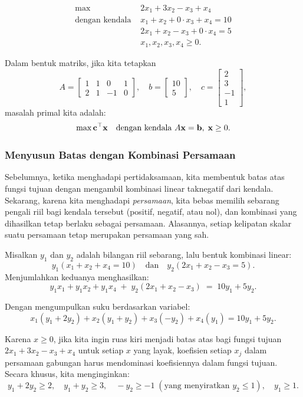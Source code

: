 \[
\begin{aligned}
\max \; & 2x_1 + 3x_2 - x_3 + x_4 \\
\text{dengan kendala } & x_1 + x_2 + 0 \cdot x_3 + x_4 = 10 \\
& 2x_1 + x_2 - x_3 + 0 \cdot x_4 = 5 \\
& x_1, x_2, x_3, x_4 \geq 0.
\end{aligned}
\]

Dalam bentuk matriks, jika kita tetapkan
\[
A = \begin{bmatrix}
1 & 1 & 0 & 1 \\
2 & 1 & -1 & 0
\end{bmatrix}, \quad b = \begin{bmatrix}10 \\ 5\end{bmatrix}, \quad c = \begin{bmatrix}2 \\ 3 \\ -1 \\ 1\end{bmatrix},
\]
masalah primal kita adalah:
\[
\max \mathbf{c}^\top \mathbf{x} \quad\mbox{dengan kendala } A \mathbf{x} = \mathbf{b}, \; \mathbf{x} \geq 0.
\]

\subsubsection*{Menyusun Batas dengan Kombinasi Persamaan}

Sebelumnya, ketika menghadapi pertidaksamaan, kita membentuk batas atas fungsi tujuan dengan mengambil kombinasi linear taknegatif dari kendala. Sekarang, karena kita menghadapi \emph{persamaan}, kita bebas memilih sebarang pengali riil bagi kendala tersebut (positif, negatif, atau nol), dan kombinasi yang dihasilkan tetap berlaku sebagai persamaan. Alasannya, setiap kelipatan skalar suatu persamaan tetap merupakan persamaan yang sah.

Misalkan $y_1$ dan $y_2$ adalah bilangan riil sebarang, lalu bentuk kombinasi linear:
\[
y_1 (x_1 + x_2 + x_4 = 10) \quad \text{dan} \quad y_2 (2x_1 + x_2 - x_3 = 5).
\]
Menjumlahkan keduanya menghasilkan:
\[
y_1 x_1 + y_1 x_2 + y_1 x_4 \;+\; y_2(2x_1 + x_2 - x_3) \;=\; 10y_1 + 5y_2.
\]

Dengan mengumpulkan suku berdasarkan variabel:
\[
x_1(y_1 + 2y_2) + x_2(y_1 + y_2) + x_3(-y_2) + x_4(y_1) = 10y_1 + 5y_2.
\]

Karena $x \geq 0$, jika kita ingin ruas kiri menjadi batas atas bagi fungsi tujuan $2x_1 + 3x_2 - x_3 + x_4$ untuk setiap $x$ yang layak, koefisien setiap $x_j$ dalam persamaan gabungan harus mendominasi koefisiennya dalam fungsi tujuan. Secara khusus, kita menginginkan:
\[
y_1 + 2y_2 \geq 2, \quad y_1 + y_2 \geq 3, \quad -y_2 \geq -1 \;(\text{yang menyiratkan } y_2 \leq 1), \quad y_1 \geq 1.
\]

